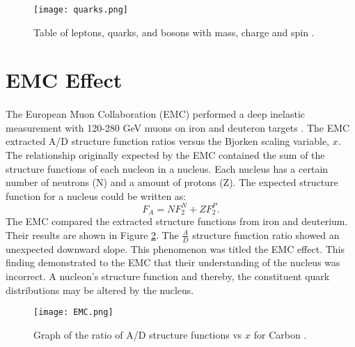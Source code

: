 \begin{figure}[]
	\centering
	\texttt{[image: quarks.png]} 
	\caption{ Table of leptons, quarks, and bosons with mass, charge and spin \cite{sane}.}
	\label{fig:quarks}
\end{figure} 

	\cite{DISearly}
	\cite{DISproton}
	\cite{whitlow_sigma}
	\cite{Q2indy}
	
	
	
\section{EMC Effect}\label{sec:EMC}
\paragraph{}The European Muon Collaboration (EMC) performed a deep inelastic measurement with 120-280 GeV muons on iron and deuteron targets \cite{challenge}. The EMC extracted A/D structure function ratios versus the Bjorken scaling variable, $x$.  The relationship originally expected by the EMC contained the sum of the structure functions of each nucleon in a nucleus. Each nucleus has a certain number of neutrons (N) and a amount of protons (Z). The expected structure function for a nucleus could be written as:
\begin{equation}
F_A = N F_2^N + ZF_2^P.
\end{equation}
 The EMC compared the extracted structure functions from iron and deuterium. Their results are shown in Figure \ref{EMCOld}. The $\frac{A}{D}$ structure function ratio showed an unexpected downward slope. This phenomenon was titled the EMC effect. This finding demonstrated to the EMC that their understanding of the nucleus was incorrect. A nucleon's structure function and thereby, the constituent quark distributions may be altered by the nucleus. 
\begin{figure}[h]
\centering
 \caption{ Graph of the ratio of A/D structure functions vs $x$ for Carbon \cite{CC}.}
 \label{EMCOld}
 \texttt{[image: EMC.png]} 
 \end{figure} 

